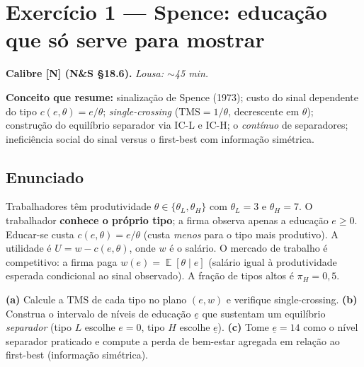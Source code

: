 \documentclass[11pt,a4paper]{article}
\newcommand{\calY}{\textbf{\textcolor{amarelo}{[N]}}} %
\newcommand{\TMS}{\text{TMS}}
\DeclareMathOperator{\Esp}{\mathbb{E}}
\newcommand{\dc}[2]{#1{,}#2}
\newif\ifsolucao
\begin{document}
\hrulefill

\section*{\textcolor{insper}{Exercício 1 — Spence: educação que só serve para mostrar}}
\noindent\textbf{Calibre \calY{} (N\&S §18.6).} \quad \emph{Lousa: $\sim$45 min.}
\par\smallskip
\noindent\textbf{Conceito que resume:} sinalização de Spence (1973); custo do sinal
dependente do tipo $c(e,\theta)=e/\theta$; \emph{single-crossing} ($\TMS=1/\theta$,
decrescente em $\theta$); construção do equilíbrio separador via IC-L e IC-H; o
\emph{contínuo} de separadores; ineficiência social do sinal versus o first-best com
informação simétrica.

\subsection*{Enunciado}
Trabalhadores têm produtividade $\theta\in\{\theta_L,\theta_H\}$ com $\theta_L=3$ e
$\theta_H=7$. O trabalhador \textbf{conhece o próprio tipo}; a firma observa apenas a
educação $e\ge 0$. Educar-se custa $c(e,\theta)=e/\theta$ (custa \emph{menos} para o tipo
mais produtivo). A utilidade é $U=w-c(e,\theta)$, onde $w$ é o salário. O mercado de trabalho
é competitivo: a firma paga $w(e)=\Esp[\theta\mid e]$ (salário igual à produtividade esperada
condicional ao sinal observado). A fração de tipos altos é $\pi_H=\dc{0}{5}$.

\smallskip
\noindent\textbf{(a)} Calcule a $\TMS$ de cada tipo no plano $(e,w)$ e verifique
single-crossing. \textbf{(b)} Construa o intervalo de níveis de educação $\underline e$ que
sustentam um equilíbrio \emph{separador} (tipo $L$ escolhe $e=0$, tipo $H$ escolhe
$\underline e$). \textbf{(c)} Tome $\underline e=14$ como o nível separador praticado e
compute a perda de bem-estar agregada em relação ao first-best (informação simétrica).

\ifsolucao
\end{document}
